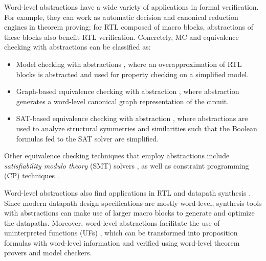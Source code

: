 Word-level abstractions have a wide variety of applications in formal 
verification. For example, they can work as automatic decision and canonical reduction engines in theorem proving;
for RTL composed of macro blocks, abstractions of these blocks also benefit RTL verification.
Concretely, MC and equivalence checking with abstractions can be classified as:
\begin{itemize}  
\item Model checking with abstractions \cite{kroening:model}, 
where an overapproximation of RTL blocks is abstracted and used for property checking on a simplified model.
\item Graph-based equivalence 
checking with abstraction \cite{WLS,arditi:bmd}, where abstraction 
generates a word-level canonical graph representation of the circuit.
\item SAT-based equivalence checking with abstraction \cite{lpsat}, where 
abstractions are used to analyze structural symmetries and similarities such that
the Boolean formulas fed to the SAT solver are simplified.
\end{itemize}

Other equivalence checking techniques that employ abstractions 
include {\it satisfiability modulo theory} (SMT) solvers \cite{boolector,bryant:tacas07},
as well as constraint programming (CP) techniques \cite{ms:research,tew:iccad08}.



Word-level abstractions also find applications in RTL and datapath 
synthesis \cite{demicheli:iccad_98,demicheli:dac_99,demicheli:tcad_03}. 
Since modern datapath design specifications are mostly word-level, synthesis tools with abstractions
can make use of larger macro blocks to generate and optimize the
datapaths. Moreover, 
word-level abstractions facilitate the use of uninterpreted functions (UFs) \cite{UF3}, which 
can be transformed into proposition formulas with word-level information and verified using 
word-level theorem provers and model checkers.

